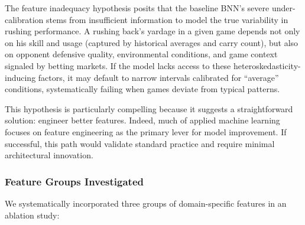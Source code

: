 The feature inadequacy hypothesis posits that the baseline BNN's severe under-calibration stems from insufficient information to model the true variability in rushing performance. A rushing back's yardage in a given game depends not only on his skill and usage (captured by historical averages and carry count), but also on opponent defensive quality, environmental conditions, and game context signaled by betting markets. If the model lacks access to these heteroskedasticity-inducing factors, it may default to narrow intervals calibrated for ``average'' conditions, systematically failing when games deviate from typical patterns.

This hypothesis is particularly compelling because it suggests a straightforward solution: engineer better features. Indeed, much of applied machine learning focuses on feature engineering as the primary lever for model improvement. If successful, this path would validate standard practice and require minimal architectural innovation.

\subsubsection{Feature Groups Investigated}

We systematically incorporated three groups of domain-specific features in an ablation study:

